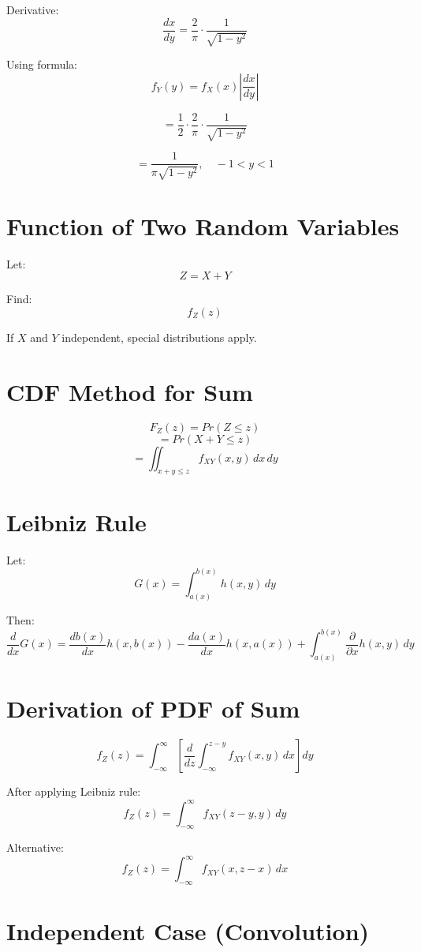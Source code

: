 \documentclass[12pt]{article}
\begin{document}
Derivative:
\[
\frac{dx}{dy} = \frac{2}{\pi} \cdot \frac{1}{\sqrt{1-y^2}}
\]

Using formula:
\[
f_Y(y) = f_X(x)\left|\frac{dx}{dy}\right|
\]

\[
= \frac{1}{2} \cdot \frac{2}{\pi} \cdot \frac{1}{\sqrt{1-y^2}}
\]

\[
= \frac{1}{\pi\sqrt{1-y^2}}, \quad -1<y<1
\]

\section{Function of Two Random Variables}

Let:
\[
Z = X + Y
\]

Find:
\[
f_Z(z)
\]

If $X$ and $Y$ independent, special distributions apply.

\section{CDF Method for Sum}

\[
F_Z(z) = Pr(Z \le z)
\]
\[
= Pr(X+Y \le z)
\]
\[
= \iint_{x+y \le z} f_{XY}(x,y)\,dx\,dy
\]

\section{Leibniz Rule}

Let:
\[
G(x) = \int_{a(x)}^{b(x)} h(x,y)\,dy
\]

Then:
\[
\frac{d}{dx}G(x)
=
\frac{db(x)}{dx}h(x,b(x))
-
\frac{da(x)}{dx}h(x,a(x))
+
\int_{a(x)}^{b(x)}
\frac{\partial}{\partial x}h(x,y)\,dy
\]

\section{Derivation of PDF of Sum}

\[
f_Z(z)
=
\int_{-\infty}^{\infty}
\left[
\frac{d}{dz}
\int_{-\infty}^{z-y}
f_{XY}(x,y)\,dx
\right] dy
\]

After applying Leibniz rule:
\[
f_Z(z)
=
\int_{-\infty}^{\infty}
f_{XY}(z-y,y)\,dy
\]

Alternative:
\[
f_Z(z)
=
\int_{-\infty}^{\infty}
f_{XY}(x,z-x)\,dx
\]

\section{Independent Case (Convolution)}
\end{document}
